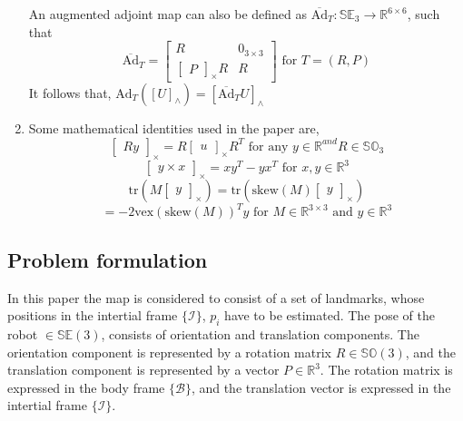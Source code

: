 \documentclass[12pt]{article}
\def\cross#1{\begin{bmatrix} #1 \end{bmatrix}_\times}
\begin{document}
\begin{enumerate}
    An augmented adjoint map can also be defined as $\overline{\text{Ad}}_T : \mathbb{SE}_3 \rightarrow \mathbb{R}^{6 \times 6}$,
    such that \[\overline{\text{Ad}}_T = \begin{bmatrix}
        R & 0_{3 \times 3} \\ \cross{P}R & R
    \end{bmatrix} \text{ for } T = (R, P) \] 
    It follows that, $\text{Ad}_T ([U]_\wedge) = [\overline{\text{Ad}}_T U ]_\wedge$
    \item Some mathematical identities used in the paper are,
    \begin{equation}
        \cross{Ry} = R \cross{u} R^T \text{ for any } y \in \mathbb{R}^ { and } R \in \mathbb{SO}_3
    \end{equation}
    \begin{equation}
        \cross{y\times x} = xy^T - yx^T \text{ for } x, y \in \mathbb{R}^3
    \end{equation}
    \begin{equation*}
        \text{tr}(M\cross{y}) = \text{tr}(\text{skew}(M) \cross{y})
    \end{equation*}
    \begin{equation}
        = -2 \text{vex}(\text{skew}(M))^T y \text{ for } M \in \mathbb{R}^{3 \times 3} \text{ and } y \in \mathbb{R}^3
    \end{equation}
\end{enumerate}
\subsection{Problem formulation}
In this paper the map is considered to consist of a set of landmarks, whose positions in the intertial frame $\{\mathcal{I}\}$, $p_i$ have to be estimated.
The pose of the robot $\in \mathbb{SE}(3)$, consists of orientation and translation components. 
The orientation component is represented by a rotation matrix $R \in \mathbb{SO}(3)$, and the translation component is represented by a vector $P \in \mathbb{R}^3$.  
The rotation matrix is expressed in the body frame $\{\mathcal{B}\}$, and the translation vector is expressed in the intertial frame $\{\mathcal{I}\}$.
\end{document}

